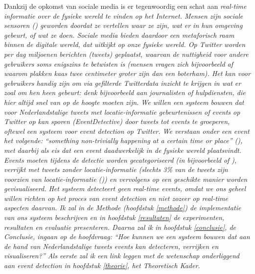 Dankzij de opkomst van sociale media is er tegenwoordig een schat aan 
\it{real-time} informatie 
over de fysieke wereld te vinden op het Internet. Mensen zijn \it{sociale 
sensoren} (\citealt{sakaki2010earthquake}) geworden doordat ze
vertellen waar ze zijn, wat er in hun omgeving gebeurt, of wat ze doen. Sociale 
media bieden daardoor een metaforisch raam binnen
de digitale wereld, dat uitkijkt op onze fysieke wereld.
\vl
Op \it{Twitter} worden per dag miljoenen berichten (\it{tweets}) geplaatst, 
waarvan de nuttigheid voor andere gebruikers soms enigszins te
betwisten is (mensen vragen zich bijvoorbeeld af waarom plakken kaas twee 
centimeter groter zijn dan een boterham).
Het kan voor gebruikers handig zijn om via gefilterde Twitterdata inzicht te 
krijgen in wat er zoal om hen heen gebeurt: denk 
bijvoorbeeld aan journalisten of hulpdiensten, die hier altijd snel van op de 
hoogte moeten zijn. We willen een systeem bouwen dat 
voor Nederlandstalige tweets met locatie-informatie gebeurtenissen of \it{events} op Twitter op kan sporen (Event\it{Detective}) door tweets 
tot events te groeperen, oftewel 
een systeem voor \it{event detection} op Twitter.
We verstaan onder een event het
volgende: \it{``something non-trivially happening at a certain time or place''} 
(\citealt{yang1998study}), met daarbij als eis 
dat een event daadwerkelijk in de fysieke wereld plaatsvindt. 
Events moeten
tijdens de detectie worden gecategoriseerd (in bijvoorbeeld  of ), verrijkt met tweets zonder locatie-informatie (slechts 3\% van de 
tweets zijn voorzien van locatie-informatie (\citealt{leetaru2013mapping})) en vervolgens op een geschikte manier 
worden gevisualiseerd.
Het systeem detecteert geen \it{real-time events},
omdat we ons geheel willen richten op het proces van event detection en niet zozeer op real-time aspecten daarvan.
\vl
Ik zal in de Methode (hoofdstuk \ref{methode}) de implementatie van ons systeem 
beschrijven en in hoofdstuk \ref{resultaten} de experimenten, resultaten en evaluatie
presenteren. Daarna zal ik in hoofdstuk \ref{conclusie}, de Conclusie, ingaan op de 
hoofdvraag: \it{``Hoe kunnen we een systeem bouwen dat aan de hand van
Nederlandstalige tweets events kan detecteren, verrijken en visualiseren?''} Als 
eerste zal ik een link leggen met de wetenschap onderliggend aan
event detection in hoofdstuk \ref{theorie}, het Theoretisch Kader.

\label{theorie}

